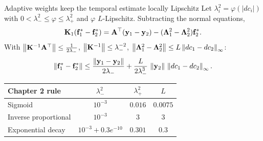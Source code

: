 \begin{frame}[label=adaptivelipschitz]{Adaptive weights keep the temporal estimate locally Lipschitz}
\small
Let $\lambda_i^2=\varphi(|dc_i|)$ with $0<\lambda_-^2\le\varphi\le\lambda_+^2$ and $\varphi$ $L$-Lipschitz. Subtracting the normal equations,
\[\mathbf K_1(\mathbf f_1^*-\mathbf f_2^*)=\mathbf A^\top(\mathbf y_1-\mathbf y_2)-(\bm\Lambda_1^2-\bm\Lambda_2^2)\mathbf f_2^*.\]
With $\left\lVert\mathbf K^{-1}\mathbf A^\top\right\rVert\le\frac1{2\lambda_-}$, $\left\lVert\mathbf K^{-1}\right\rVert\le\lambda_-^{-2}$, $\left\lVert\bm\Lambda_1^2-\bm\Lambda_2^2\right\rVert\le L\left\lVert dc_1-dc_2\right\rVert_\infty$:
\[\left\lVert\mathbf f_1^*-\mathbf f_2^*\right\rVert\le\frac{\left\lVert\mathbf y_1-\mathbf y_2\right\rVert}{2\lambda_-}+\frac{L}{2\lambda_-^3}\,\left\lVert\mathbf y_2\right\rVert\,\left\lVert dc_1-dc_2\right\rVert_\infty.\]
\begin{center}\footnotesize\renewcommand{\arraystretch}{1.0}\begin{tabular}{lccc}\toprule
Chapter 2 rule & $\lambda_-^2$ & $\lambda_+^2$ & $L$\\\midrule
Sigmoid & $10^{-3}$ & $0.016$ & $0.0075$\\
Inverse proportional & $10^{-3}$ & $3$ & $3$\\
Exponential decay & $10^{-3}+0.3e^{-10}$ & $0.301$ & $0.3$\\\bottomrule
\end{tabular}\end{center}

\end{frame}
